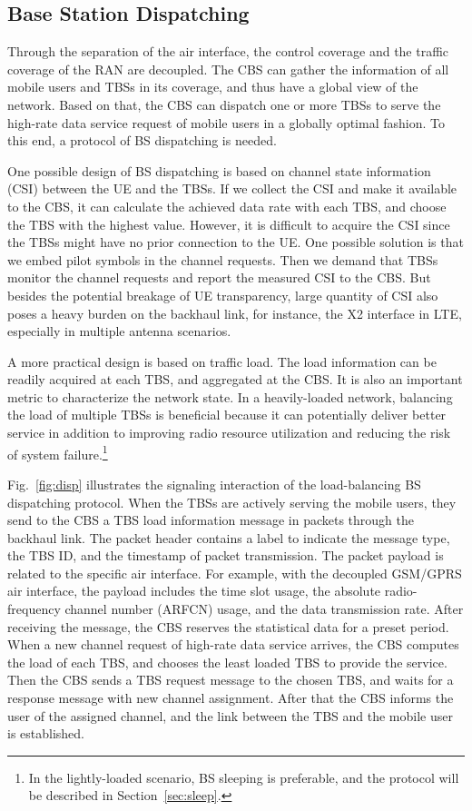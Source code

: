 \documentclass[conference]{IEEEtran}
\begin{document}
\subsection{Base Station Dispatching}
\label{sec:disp}

Through the separation of the air interface, the control coverage and the traffic
coverage of the RAN are decoupled. The CBS can gather the information of all
mobile users and TBSs in its coverage, and thus have a global view of the
network. Based on that, the CBS can dispatch one or more TBSs to serve the
high-rate data service request of mobile users in
a globally optimal fashion. To this end, a protocol of BS
dispatching is needed.

One possible design of BS dispatching is based on channel state information
(CSI) between the UE and the TBSs. If we collect the CSI and make it available
to the CBS, it can calculate the achieved data rate with each TBS, and choose
the TBS with the highest value. However, it is difficult to acquire the CSI
since the TBSs might have no prior connection to the UE. One possible solution
is that we embed pilot symbols in the channel requests. Then we
demand that TBSs monitor the channel requests and report the measured CSI to the
CBS. But besides the potential breakage of UE transparency, large quantity of CSI
also poses a heavy
burden on the backhaul link, for instance,
the X2 interface in LTE, especially in multiple antenna scenarios.

A more practical design is based on traffic load.
The load information can be readily acquired at each TBS, and aggregated at the
CBS. It is also an important metric to characterize the network state.
In a heavily-loaded network, balancing the load of multiple TBSs is beneficial because it
can potentially deliver better service in addition to improving radio resource
utilization and reducing the risk of system failure.\footnote{In the lightly-loaded scenario, BS sleeping is preferable, and the protocol will be described in
Section~\ref{sec:sleep}.}

Fig.~\ref{fig:disp} illustrates the signaling
interaction of the load-balancing BS dispatching protocol.
When the TBSs are actively serving the mobile users, they send to the CBS a
TBS load information message in packets through the backhaul link.
The packet header contains a label to indicate the message type, the TBS ID,
and the timestamp of packet transmission.
The packet payload is related to the specific air interface. For example, with
the decoupled GSM/GPRS air interface, the payload includes
the time slot usage, the absolute radio-frequency channel number (ARFCN) usage, and the data transmission rate.
After receiving the message, the CBS reserves the
statistical data for a preset period. When a new channel request of high-rate data
service arrives, the CBS computes the load of each TBS, and chooses the
least loaded TBS to provide the service. Then the CBS sends a TBS request
message to the chosen TBS, and waits for a response message with new channel
assignment. After that the CBS informs the user of the assigned channel, and
the link between the TBS and the mobile user is established.
\end{document}

